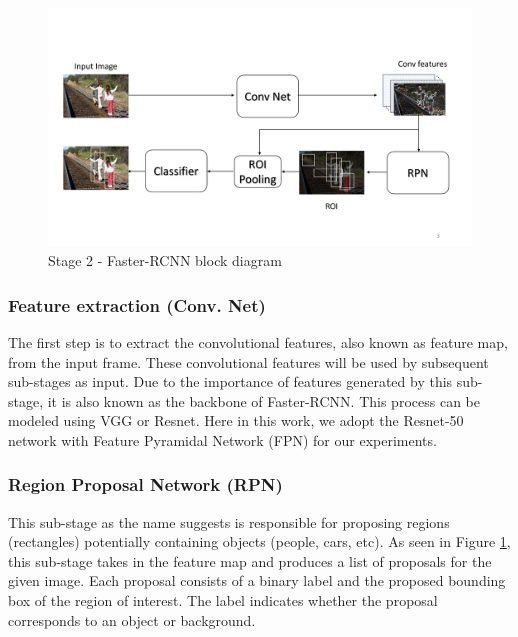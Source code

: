 \begin{figure}
    \centering
    \includegraphics[width=\linewidth,trim={0 80 0 120},clip]{images/faster-rcnn-pipeline}
    \caption{Stage 2 - Faster-RCNN block diagram}
    \label{fig:faster-rcnn-pipeline}
\end{figure}

\vspace{5pt}
\subsubsection{Feature extraction (Conv. Net)}
\label{sec:feature-extraction}
The first step is to extract the convolutional features, also known as feature map, from the input frame. These convolutional features will be used by subsequent sub-stages as input. Due to the importance of features generated by this sub-stage, it is also known as the backbone of Faster-RCNN. This process can be modeled using VGG\cite{simonyan2014very} or Resnet\cite{he2016deep}. Here in this work, we adopt the Resnet-50 network with Feature Pyramidal Network (FPN) \cite{lin2017feature} for our experiments. 

\vspace{5pt}
\subsubsection{Region Proposal Network (RPN)}
This sub-stage as the name suggests is responsible for proposing regions (rectangles) potentially containing objects (people, cars, etc). As seen in Figure \ref{fig:faster-rcnn-pipeline}, this sub-stage takes in the feature map and produces a list of proposals for the given image. Each proposal consists of a binary label and the proposed bounding box of the region of interest. The label indicates whether the proposal corresponds to an object or background. 

